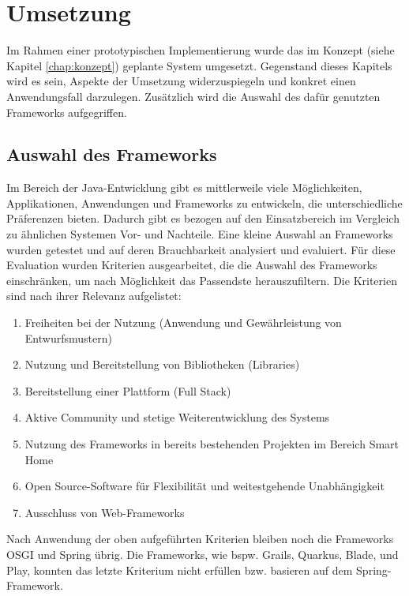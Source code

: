 \chapter{Umsetzung}
\label{chap:umsetzung}
    Im Rahmen einer prototypischen Implementierung wurde das im Konzept (siehe Kapitel \ref{chap:konzept}) geplante System
    umgesetzt. Gegenstand dieses Kapitels wird es sein, Aspekte der Umsetzung widerzuspiegeln und konkret einen  
    Anwendungsfall darzulegen. Zusätzlich wird die Auswahl des dafür genutzten Frameworks aufgegriffen. 

\section{Auswahl des Frameworks}
\label{sec:frameworkauswahl}
    Im Bereich der Java-Entwicklung gibt es mittlerweile viele Möglichkeiten, Applikationen, Anwendungen und Frameworks 
    zu entwickeln, die unterschiedliche Präferenzen bieten. Dadurch gibt es bezogen auf den Einsatzbereich im Vergleich zu ähnlichen Systemen 
    Vor- und Nachteile. Eine kleine Auswahl an Frameworks wurden getestet und auf deren 
    Brauchbarkeit analysiert und evaluiert. Für diese Evaluation wurden Kriterien ausgearbeitet, die die Auswahl des Frameworks 
    einschränken, um nach Möglichkeit das Passendste herauszufiltern. Die Kriterien sind nach ihrer Relevanz aufgelistet: 
    \begin{enumerate}
        \item Freiheiten bei der Nutzung (Anwendung und Gewährleistung von Entwurfsmustern)
        \item Nutzung und Bereitstellung von Bibliotheken (Libraries)
        \item Bereitstellung einer Plattform (Full Stack)
        \item Aktive Community und stetige Weiterentwicklung des Systems
        \item Nutzung des Frameworks in bereits bestehenden Projekten im Bereich Smart Home
        \item Open Source-Software für Flexibilität und weitestgehende Unabhängigkeit
        \item Ausschluss von Web-Frameworks
    \end{enumerate}  
    Nach Anwendung der oben aufgeführten Kriterien bleiben noch die Frameworks \acs{OSGI} und Spring übrig. Die 
    Frameworks, wie bspw. Grails, Quarkus, Blade, und Play, konnten das letzte Kriterium nicht erfüllen bzw. basieren 
    auf dem Spring-Framework. 

